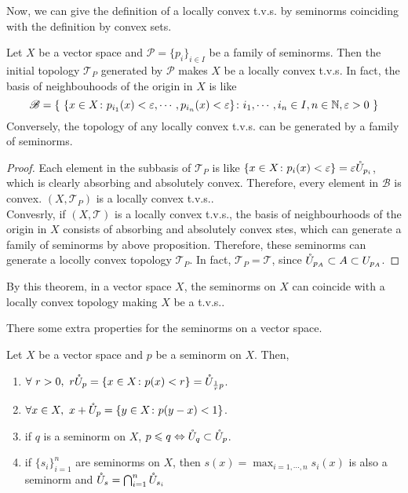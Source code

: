 \documentclass[a4paper,11pt]{report}
\begin{document}
Now, we can give the definition of a locally convex t.v.s. by seminorms coinciding with the definition by convex sets.

\begin{thm}
	Let $X$ be a vector space and $\mathscr{P} = \{p_i\}_{i \in I}$ be a family of seminorms. Then the initial topology $\mathscr{T}_P$ generated by $\mathscr{P}$ makes $X$ be a locally convex t.v.s. In fact, the basis of neighbouhoods of the origin in $X$ is like
	\begin{equation*}
		\mathscr{B} = \left\{~ \{x \in X \colon p_{i_1}(x)<\varepsilon,\cdots,p_{i_n}(x)<\varepsilon\} \colon i_1,\cdots,i_n \in I,n \in \mathbb{N}, \varepsilon > 0 ~\right\}
	\end{equation*}
	Conversely, the topology of any locally convex t.v.s. can be generated by a family of seminorms.
\end{thm}
\begin{proof}
	Each element in the subbasis of $\mathscr{T}_P$ is like $\{ x \in X \colon p_i(x) < \varepsilon \} = \varepsilon \mathring{U}_{p_i}$, which is clearly absorbing and absolutely convex. Therefore, every element in $\mathscr{B}$ is convex. $(X,\mathscr{T}_P)$ is a locally convex t.v.s..\\
	Convesrly, if $(X, \mathscr{T})$ is a locally convex t.v.s., the basis of neighbourhoods of the origin in $X$ consists of absorbing and absolutely convex stes, which can generate a family of seminorms by above proposition. Therefore, these seminorms can generate a locolly convex topology $\mathscr{T}_P$. In fact, $\mathscr{T}_P = \mathscr{T}$, since $\mathring{U}_{p_A} \subset A \subset U_{p_A}$.
\end{proof}
\begin{rem}
	By this theorem, in a vector space $X$, the seminorms on $X$ can coincide with a locally convex topology making $X$ be a t.v.s..
\end{rem}

There some extra properties for the seminorms on a vector space.
\begin{prop} \label{prop1}
	Let $X$ be a vector space and $p$ be a seminorm on $X$. Then,
	\begin{enumerate}[label=\arabic*)]
		\item $\forall~ r>0,~ r \mathring{U}_p=\{x \in X \colon p(x) <r\} = \mathring{U}_{\frac{1}{r}p}$.
		\item $\forall x \in X,~ x+\mathring{U}_p = \{y \in X \colon p(y-x) < 1\}$.
		\item if $q$ is a seminorm on $X$, $p \leqslant q \Leftrightarrow \mathring{U}_q \subset \mathring{U}_p$.
		\item if $\{s_i\}_{i=1}^{n}$ are seminorms on $X$, then $s(x) = \max_{i=1,\cdots,n}{s_i(x)}$ is also a seminorm and $\mathring{U}_s = \bigcap_{i=1}^{n} \mathring{U}_{s_i}$
	\end{enumerate}
\end{prop}
\end{document}
